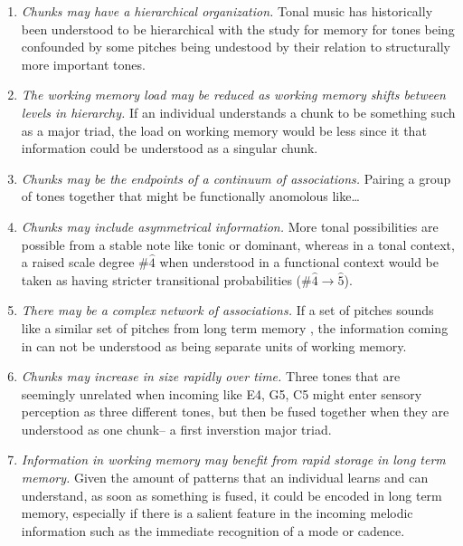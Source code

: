 \documentclass[]{book}
\providecommand{\tightlist}{%
  \setlength{\itemsep}{0pt}\setlength{\parskip}{0pt}}
\theoremstyle{definition}
\theoremstyle{definition}
\theoremstyle{definition}
\theoremstyle{remark}
\begin{document}
\begin{enumerate}
\def\labelenumi{\arabic{enumi}.}
\tightlist
\item
  \emph{Chunks may have a hierarchical organization.} Tonal music has
  historically been understood to be hierarchical
  \citep{krumhanslCognitiveFoundationsMusical2001, meyerEmotionMeaningMusic1956, schenkerFreieSatz1935}
  with the study for memory for tones being confounded by some pitches
  being undestood by their relation to structurally more important
  tones.
\item
  \emph{The working memory load may be reduced as working memory shifts
  between levels in hierarchy.} If an individual understands a chunk to
  be something such as a major triad, the load on working memory would
  be less since it that information could be understood as a singular
  chunk.
\item
  \emph{Chunks may be the endpoints of a continuum of associations.}
  Pairing a group of tones together that might be functionally anomolous
  like\ldots{}
\item
  \emph{Chunks may include asymmetrical information.} More tonal
  possibilities are possible from a stable note like tonic or dominant,
  whereas in a tonal context, a raised scale degree \#\(\hat{4}\) when
  understood in a functional context would be taken as having stricter
  transitional probabilities (\#\(\hat{4} \rightarrow \hat{5}\)).
\item
  \emph{There may be a complex network of associations.} If a set of
  pitches sounds like a similar set of pitches from long term memory ,
  the information coming in can not be understood as being separate
  units of working memory.
\item
  \emph{Chunks may increase in size rapidly over time.} Three tones that
  are seemingly unrelated when incoming like E4, G5, C5 might enter
  sensory perception as three different tones, but then be fused
  together when they are understood as one chunk-- a first inverstion
  major triad.
\item
  \emph{Information in working memory may benefit from rapid storage in
  long term memory.} Given the amount of patterns that an individual
  learns and can understand, as soon as something is fused, it could be
  encoded in long term memory, especially if there is a salient feature
  in the incoming melodic information such as the immediate recognition
  of a mode or cadence.
\end{enumerate}
\end{document}
